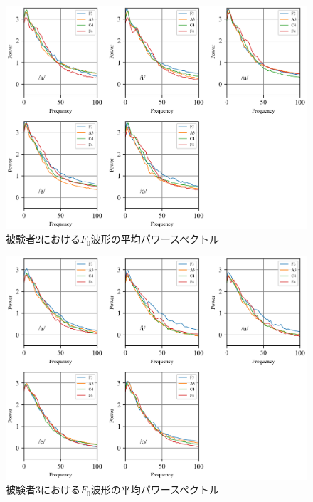\documentclass[10.5ptj,a4j,dvipdfmx,uplatex, oneside, openany, report]{jsbook}%
\begin{document}
\begin{figure}[tbhp]
    \begin{center}
      \includegraphics[clip,width=12.0cm]{long_spectrogram_2.png}
      \caption{被験者2における$F_0$波形の平均パワースペクトル}
      \label{long_spectrogram_2}
    \end{center}
\end{figure}

\begin{figure}[thbp]
    \begin{center}
      \includegraphics[clip,width=12.0cm]{long_spectrogram_3.png}
      \caption{被験者3における$F_0$波形の平均パワースペクトル}
      \label{long_spectrogram_3}
    \end{center}
\end{figure}
\end{document}
